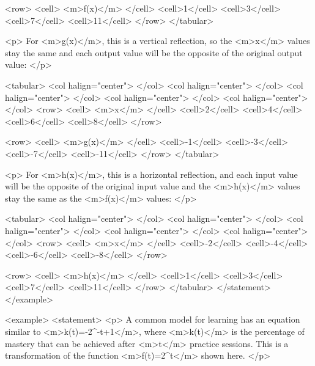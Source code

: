                     <row>
                        <cell> <m>f(x)</m> </cell>
                        <cell>1</cell>
                        <cell>3</cell>
                        <cell>7</cell>
                        <cell>11</cell>
                    </row>
                </tabular>

                <p>
                    For <m>g(x)</m>, this is a vertical reflection, so the <m>x</m> values stay the same and each output value will be the opposite of the original output value:
                </p>

                <tabular>
                    <col halign="center"> </col> <col halign="center"> </col> <col halign="center"> </col> <col halign="center"> </col> <col halign="center"> </col>
                    <row>
                        <cell> <m>x</m> </cell>
                        <cell>2</cell>
                        <cell>4</cell>
                        <cell>6</cell>
                        <cell>8</cell>
                    </row>

                    <row>
                        <cell> <m>g(x)</m> </cell>
                        <cell>-1</cell>
                        <cell>-3</cell>
                        <cell>-7</cell>
                        <cell>-11</cell>
                    </row>
                </tabular>

                <p>
                    For <m>h(x)</m>, this is a horizontal reflection, and each input value will be the opposite of the original input value and the <m>h(x)</m> values stay the same as the <m>f(x)</m> values:
                </p>

                <tabular>
                    <col halign="center"> </col> <col halign="center"> </col> <col halign="center"> </col> <col halign="center"> </col> <col halign="center"> </col>
                    <row>
                        <cell> <m>x</m> </cell>
                        <cell>-2</cell>
                        <cell>-4</cell>
                        <cell>-6</cell>
                        <cell>-8</cell>
                    </row>

                    <row>
                        <cell> <m>h(x)</m> </cell>
                        <cell>1</cell>
                        <cell>3</cell>
                        <cell>7</cell>
                        <cell>11</cell>
                    </row>
                </tabular>
            </statement>
        </example>

        <example>
            <statement>
                <p>
                    A common model for learning has an equation similar to <m>k(t)=-2^{-t}+1</m>, where <m>k(t)</m> is the percentage of mastery that can be achieved after <m>t</m> practice sessions.
                    This is a transformation of the function <m>f(t)=2^{t}</m> shown here.
                </p>

